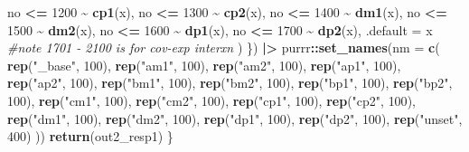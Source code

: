 \documentclass[12pt, twoside]{amherstthesis}
\newenvironment{Shaded}{\begin{snugshade}}{\end{snugshade}}
\newcommand{\AttributeTok}[1]{\textcolor[rgb]{0.13,0.29,0.53}{#1}}
\newcommand{\CommentTok}[1]{\textcolor[rgb]{0.56,0.35,0.01}{\textit{#1}}}
\newcommand{\DecValTok}[1]{\textcolor[rgb]{0.00,0.00,0.81}{#1}}
\newcommand{\FunctionTok}[1]{\textcolor[rgb]{0.13,0.29,0.53}{\textbf{#1}}}
\newcommand{\NormalTok}[1]{#1}
\newcommand{\SpecialCharTok}[1]{\textcolor[rgb]{0.81,0.36,0.00}{\textbf{#1}}}
\newcommand{\StringTok}[1]{\textcolor[rgb]{0.31,0.60,0.02}{#1}}
\begin{document}
\begin{Shaded}
\begin{Highlighting}[]
\NormalTok{        no }\SpecialCharTok{\textless{}=} \DecValTok{1200} \SpecialCharTok{\textasciitilde{}} \FunctionTok{cp1}\NormalTok{(x), }
\NormalTok{        no }\SpecialCharTok{\textless{}=} \DecValTok{1300} \SpecialCharTok{\textasciitilde{}} \FunctionTok{cp2}\NormalTok{(x), }
\NormalTok{        no }\SpecialCharTok{\textless{}=} \DecValTok{1400} \SpecialCharTok{\textasciitilde{}} \FunctionTok{dm1}\NormalTok{(x), }
\NormalTok{        no }\SpecialCharTok{\textless{}=} \DecValTok{1500} \SpecialCharTok{\textasciitilde{}} \FunctionTok{dm2}\NormalTok{(x), }
\NormalTok{        no }\SpecialCharTok{\textless{}=} \DecValTok{1600} \SpecialCharTok{\textasciitilde{}} \FunctionTok{dp1}\NormalTok{(x), }
\NormalTok{        no }\SpecialCharTok{\textless{}=} \DecValTok{1700} \SpecialCharTok{\textasciitilde{}} \FunctionTok{dp2}\NormalTok{(x), }
        \AttributeTok{.default =}\NormalTok{ x }\CommentTok{\#note 1701 {-} 2100 is for cov{-}exp interxn}
\NormalTok{      ) }
\NormalTok{    \}) }\SpecialCharTok{|\textgreater{}} 
\NormalTok{    purrr}\SpecialCharTok{::}\FunctionTok{set\_names}\NormalTok{(}\AttributeTok{nm =} \FunctionTok{c}\NormalTok{(}
      \FunctionTok{rep}\NormalTok{(}\StringTok{"\_base"}\NormalTok{, }\DecValTok{100}\NormalTok{), }
      \FunctionTok{rep}\NormalTok{(}\StringTok{"am1"}\NormalTok{, }\DecValTok{100}\NormalTok{), }
      \FunctionTok{rep}\NormalTok{(}\StringTok{"am2"}\NormalTok{, }\DecValTok{100}\NormalTok{), }
      \FunctionTok{rep}\NormalTok{(}\StringTok{"ap1"}\NormalTok{, }\DecValTok{100}\NormalTok{), }
      \FunctionTok{rep}\NormalTok{(}\StringTok{"ap2"}\NormalTok{, }\DecValTok{100}\NormalTok{), }
      \FunctionTok{rep}\NormalTok{(}\StringTok{"bm1"}\NormalTok{, }\DecValTok{100}\NormalTok{), }
      \FunctionTok{rep}\NormalTok{(}\StringTok{"bm2"}\NormalTok{, }\DecValTok{100}\NormalTok{), }
      \FunctionTok{rep}\NormalTok{(}\StringTok{"bp1"}\NormalTok{, }\DecValTok{100}\NormalTok{), }
      \FunctionTok{rep}\NormalTok{(}\StringTok{"bp2"}\NormalTok{, }\DecValTok{100}\NormalTok{), }
      \FunctionTok{rep}\NormalTok{(}\StringTok{"cm1"}\NormalTok{, }\DecValTok{100}\NormalTok{), }
      \FunctionTok{rep}\NormalTok{(}\StringTok{"cm2"}\NormalTok{, }\DecValTok{100}\NormalTok{), }
      \FunctionTok{rep}\NormalTok{(}\StringTok{"cp1"}\NormalTok{, }\DecValTok{100}\NormalTok{), }
      \FunctionTok{rep}\NormalTok{(}\StringTok{"cp2"}\NormalTok{, }\DecValTok{100}\NormalTok{), }
      \FunctionTok{rep}\NormalTok{(}\StringTok{"dm1"}\NormalTok{, }\DecValTok{100}\NormalTok{), }
      \FunctionTok{rep}\NormalTok{(}\StringTok{"dm2"}\NormalTok{, }\DecValTok{100}\NormalTok{), }
      \FunctionTok{rep}\NormalTok{(}\StringTok{"dp1"}\NormalTok{, }\DecValTok{100}\NormalTok{), }
      \FunctionTok{rep}\NormalTok{(}\StringTok{"dp2"}\NormalTok{, }\DecValTok{100}\NormalTok{), }
      \FunctionTok{rep}\NormalTok{(}\StringTok{"unset"}\NormalTok{, }\DecValTok{400}\NormalTok{)}
\NormalTok{    ))}
  \FunctionTok{return}\NormalTok{(out2\_resp1)}
\NormalTok{\}}


\end{Highlighting}
\end{Shaded}
\end{document}
